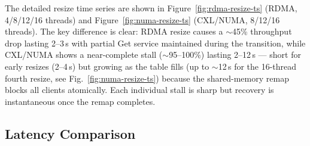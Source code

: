 \documentclass[conference]{IEEEtran}
\begin{document}
\begin{table}[H]
\centering
\caption{Resizing disruption: Paper Figure~17 vs.\ our measurements}
\label{tab:resize-cmp}
\scriptsize
{}
\end{table}

The detailed resize time series are shown in Figure~\ref{fig:rdma-resize-ts} (RDMA, 4/8/12/16 threads) and Figure~\ref{fig:numa-resize-ts} (CXL/NUMA, 8/12/16 threads). The key difference is clear: RDMA resize causes a $\sim$45\% throughput drop lasting 2--3\,s with partial Get service maintained during the transition, while CXL/NUMA shows a near-complete stall ($\sim$95--100\%) lasting 2--12\,s --- short for early resizes (2--4\,s) but growing as the table fills (up to $\sim$12\,s for the 16-thread fourth resize, see Fig.~\ref{fig:numa-resize-ts}) because the shared-memory remap blocks all clients atomically. Each individual stall is sharp but recovery is instantaneous once the remap completes.

\subsection{Latency Comparison}

\begin{table}[H]
\centering
\caption{Latency comparison at 8 threads, YCSB-C}
\label{tab:latency-cmp}
\scriptsize
{}
\end{table}
\end{document}
